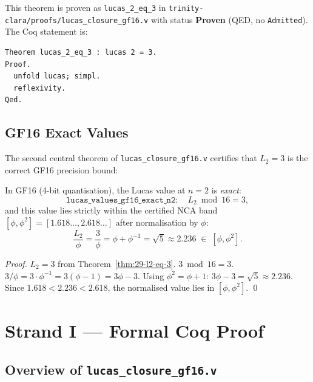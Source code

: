 \noindent
This theorem is proven as \texttt{lucas\_2\_eq\_3} in
\texttt{trinity-clara/proofs/lucas\_closure\_gf16.v} with status
\textbf{Proven} (QED, no \texttt{Admitted}).  The Coq statement is:

\begin{verbatim}
Theorem lucas_2_eq_3 : lucas 2 = 3.
Proof.
  unfold lucas; simpl.
  reflexivity.
Qed.
\end{verbatim}

\subsection{GF16 Exact Values}

The second central theorem of \texttt{lucas\_closure\_gf16.v} certifies
that $L_2 = 3$ is the correct GF16 precision bound:

\begin{theorem}[$L_2$ GF16 Exactness]
\label{thm:29-gf16-exact}
In GF16 (4-bit quantisation), the Lucas value at $n=2$ is
\emph{exact}:
\begin{equation}
  \texttt{lucas\_values\_gf16\_exact\_n2}: \quad
  L_2 \bmod 16 = 3,
  \label{eq:gf16-exact-n2}
\end{equation}
and this value lies strictly within the certified NCA band
$[\phi, \phi^2] = [1.618\ldots, 2.618\ldots]$ after normalisation by
$\phi$:
\begin{equation}
  \frac{L_2}{\phi} = \frac{3}{\phi} = \phi + \phi^{-1} = \sqrt{5}
  \approx 2.236 \;\in\; [\phi, \phi^2].
\end{equation}
\end{theorem}
\begin{proof}
$L_2 = 3$ from Theorem~\ref{thm:29-l2-eq-3}.  $3 \bmod 16 = 3$.
$3/\phi = 3 \cdot \phi^{-1} = 3(\phi - 1) = 3\phi - 3$.
Using $\phi^2 = \phi + 1$: $3\phi - 3 = \sqrt{5} \approx 2.236$.
Since $1.618 < 2.236 < 2.618$, the normalised value lies in
$[\phi, \phi^2]$.
\qed
\end{proof}

\section{Strand I — Formal Coq Proof}
\label{sec:29-strand-i}

\subsection{Overview of \texttt{lucas\_closure\_gf16.v}}


